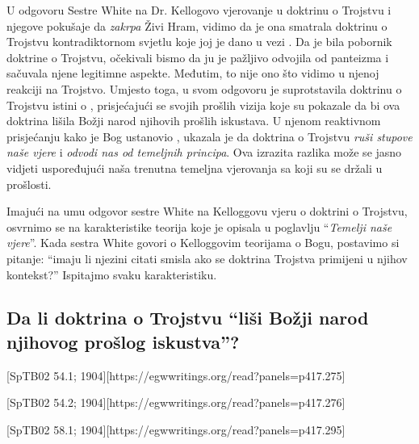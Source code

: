 
U odgovoru Sestre White na Dr. Kellogovo vjerovanje u doktrinu o Trojstvu i njegove pokušaje da \textit{zakrpa} Živi Hram, vidimo da je ona smatrala doktrinu o Trojstvu kontradiktornom svjetlu koje joj je dano u vezi . Da je bila pobornik doktrine o Trojstvu, očekivali bismo da ju je pažljivo odvojila od panteizma i sačuvala njene legitimne aspekte. Međutim, to nije ono što vidimo u njenoj reakciji na Trojstvo. Umjesto toga, u svom odgovoru je suprotstavila doktrinu o Trojstvu istini o , prisjećajući se svojih prošlih vizija koje su pokazale da bi ova doktrina lišila Božji narod njihovih prošlih iskustava. U njenom reaktivnom prisjećanju kako je Bog ustanovio , ukazala je da doktrina o Trojstvu \textit{ruši stupove naše vjere} i \textit{odvodi nas od temeljnih principa}. Ova izrazita razlika može se jasno vidjeti uspoređujući naša trenutna temeljna vjerovanja sa  koji su se držali u prošlosti.

Imajući na umu odgovor sestre White na Kelloggovu vjeru o doktrini o Trojstvu, osvrnimo se na karakteristike teorija koje je opisala u poglavlju “\textit{Temelji naše vjere}”. Kada sestra White govori o Kelloggovim teorijama o Bogu, postavimo si pitanje: “imaju li njezini citati smisla ako se doktrina Trojstva primijeni u njihov kontekst?” Ispitajmo svaku karakteristiku.

\subsection*{Da li doktrina o Trojstvu “liši Božji narod njihovog prošlog iskustva”?}

[SpTB02 54.1; 1904][https://egwwritings.org/read?panels=p417.275]

[SpTB02 54.2; 1904][https://egwwritings.org/read?panels=p417.276]

[SpTB02 58.1; 1904][https://egwwritings.org/read?panels=p417.295]


